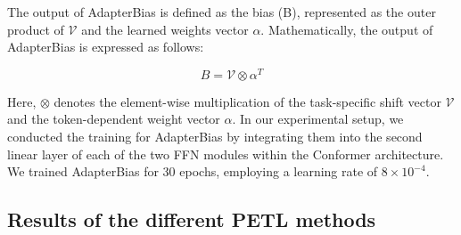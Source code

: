 The output of AdapterBias is defined as the bias (B), represented as the outer product of $\mathcal{V}$ and the learned weights vector $\alpha$. Mathematically, the output of AdapterBias is expressed as follows:

\begin{equation}
    B = \mathcal{V} \otimes \alpha^T    
\end{equation}

Here, \(\otimes\) denotes the element-wise multiplication of the task-specific shift vector \(\mathcal{V}\) and the token-dependent weight vector \(\alpha\).
In our experimental setup, we conducted the training for AdapterBias by integrating them into the second linear layer of each of the two FFN modules within the Conformer architecture. We trained AdapterBias for 30 epochs, employing a learning rate of $8 \times 10^{-4}$.

\subsection{Results of the different PETL methods}

